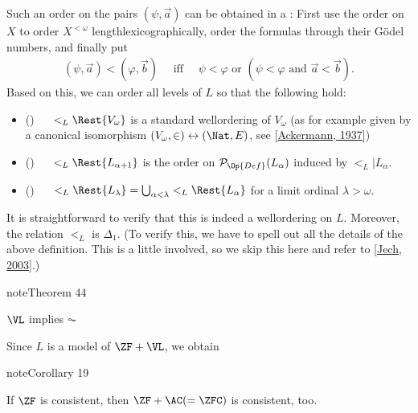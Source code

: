 \documentclass[letterpaper,10pt,english]{jupyterBook}
\begin{document}
\sphinxAtStartPar
Such an order on the pairs \((\psi, \vec{a})\) can be obtained in a : First use the order on \(X\) to order \(X^{<\omega}\) length\sphinxhyphen{}lexicographically, order the formulas through their Gödel numbers, and finally put
\begin{equation*}
\begin{split}
	(\psi,\vec{a}) < (\varphi, \vec{b}) \quad \text{ iff } \quad \psi < \varphi \text { or } (\psi < \varphi \text { and } \vec{a} < \vec{b}).
\end{split}
\end{equation*}
\sphinxAtStartPar
Based on this, we can order all levels of \(L\) so that the following hold:
\begin{itemize}
\item {} 
\sphinxAtStartPar
() \(\quad\)   \(<_L \Rest{V_\omega}\) is a standard well\sphinxhyphen{}ordering of \(V_\omega\)   (as for example given by a canonical isomorphism \((V_\omega, \in) \leftrightarrow (\Nat, E)\), see {[}\hyperlink{cite.bibliography:id2}{Ackermann, 1937}{]})

\item {} 
\sphinxAtStartPar
() \(\quad\)   \(<_L\Rest{L_{\alpha+1}}\) is the order on \(\mathcal{P}_{\Op{Def}}(L_\alpha)\) induced by \(<_L|L_\alpha\).

\item {} 
\sphinxAtStartPar
() \(\quad\)   \(<_L\Rest{L_\lambda} = \bigcup_{\alpha < \lambda} <_L \Rest{L_\alpha}\) for a limit ordinal \(\lambda > \omega\).

\end{itemize}

\sphinxAtStartPar
It is straightforward to verify that this is indeed a well\sphinxhyphen{}ordering on \(L\). Moreover, the relation \(<_L\) is \(\Delta_1\). (To verify this, we have to spell out all the details of the above definition. This is a little involved, so we skip this here and refer to {[}\hyperlink{cite.bibliography:id8}{Jech, 2003}{]}.)
\label{V=L:thm-L-AC}
\begin{sphinxadmonition}{note}{Theorem 44}



\sphinxAtStartPar
\(\VL\) implies \(\AC\)
\end{sphinxadmonition}

\sphinxAtStartPar
Since \(L\) is a model of \(\ZF+\VL\), we obtain
\label{V=L:cor-Con(AC)}
\begin{sphinxadmonition}{note}{Corollary 19}



\sphinxAtStartPar
If \(\ZF\) is consistent, then \(\ZF+\AC (= \ZFC)\) is consistent, too.
\end{sphinxadmonition}
\end{document}

